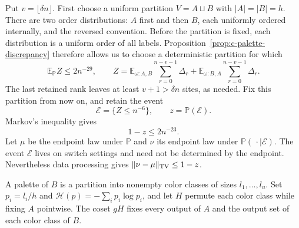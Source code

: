 Put $v=\lfloor\delta n\rfloor$.  First choose a uniform partition
$V=A\sqcup B$ with $|A|=|B|=h$.  There are two order distributions:
$A$ first and then $B$, each uniformly ordered internally, and the
reversed convention.  Before the partition is fixed, each distribution
is a uniform order of all labels.  Proposition~\ref{prop:c-palette-discrepancy}
therefore allows us to choose a deterministic partition for which
\[
 \mathbb E_{\mathbb P}Z\le2n^{-29},\qquad
 Z=\mathbb E_{\omega:A,B}\sum_{r=0}^{n-v-1}\Delta_r
   +\mathbb E_{\omega:B,A}\sum_{r=0}^{n-v-1}\Delta_r.
\]
The last retained rank leaves at least $v+1>\delta n$ sites, as needed.
Fix this partition from now on, and retain the event
\[
 \mathcal E=\{Z\le n^{-6}\},\qquad z=\mathbb P(\mathcal E).
\]
Markov's inequality gives
\begin{equation}
 1-z\le2n^{-23}.
 \label{eq:c-palette-retained-mass}
\end{equation}
Let $\mu$ be the endpoint law under $\mathbb P$ and $\nu$ its endpoint
law under $\mathbb P(\,\cdot\mid\mathcal E)$.  The event $\mathcal E$
lives on switch settings and need not be determined by the endpoint.
Nevertheless data processing gives
$\|\nu-\mu\|_{\rm TV}\le1-z$.

A palette of $B$ is a partition into nonempty color classes of sizes
$l_1,\ldots,l_u$.  Set $p_i=l_i/h$ and
$\mathcal H(p)=-\sum_i p_i\log p_i$, and let $H$ permute each color
class while fixing $A$ pointwise.  The coset $gH$ fixes every output of
$A$ and the output set of each color class of $B$.

